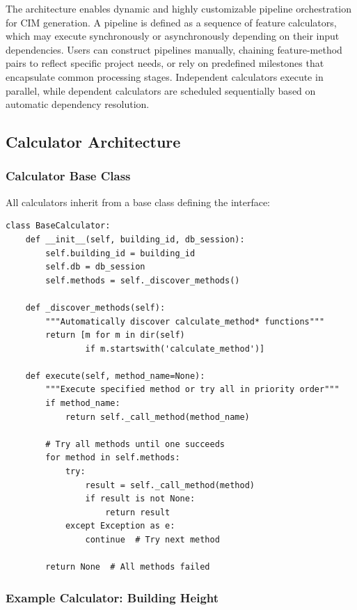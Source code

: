 The architecture enables dynamic and highly customizable pipeline orchestration for CIM generation. A pipeline is defined as a sequence of feature calculators, which may execute synchronously or asynchronously depending on their input dependencies. Users can construct pipelines manually, chaining feature-method pairs to reflect specific project needs, or rely on predefined milestones that encapsulate common processing stages. Independent calculators execute in parallel, while dependent calculators are scheduled sequentially based on automatic dependency resolution.

\subsection{Calculator Architecture}

\subsubsection{Calculator Base Class}

All calculators inherit from a base class defining the interface:

\begin{lstlisting}[style=pythonstyle, caption=Calculator base class structure]
class BaseCalculator:
    def __init__(self, building_id, db_session):
        self.building_id = building_id
        self.db = db_session
        self.methods = self._discover_methods()
    
    def _discover_methods(self):
        """Automatically discover calculate_method* functions"""
        return [m for m in dir(self) 
                if m.startswith('calculate_method')]
    
    def execute(self, method_name=None):
        """Execute specified method or try all in priority order"""
        if method_name:
            return self._call_method(method_name)
        
        # Try all methods until one succeeds
        for method in self.methods:
            try:
                result = self._call_method(method)
                if result is not None:
                    return result
            except Exception as e:
                continue  # Try next method
        
        return None  # All methods failed
\end{lstlisting}

\subsubsection{Example Calculator: Building Height}

